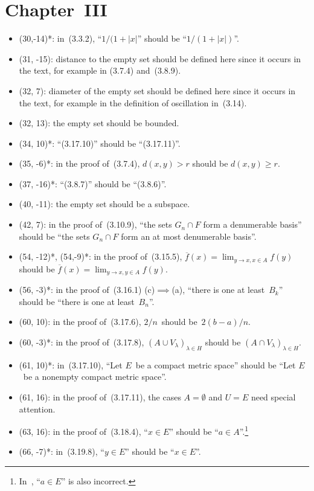 \documentclass[letterpaper,12pt]{article}
\newcommand{\union}{\cup}
\newcommand{\sect}{\cap}
\newcommand{\abs}[1]{|{#1}|}
\begin{document}
\section*{Chapter~III}
\begin{itemize}
\item (30,-14)*: in~(3.3.2), ``\(1/(1+\abs{x}\)'' should be ``\(1/(1+\abs{x})\)''.
\item (31, -15): distance to the empty set should be defined here since it occurs in the text, for example in (3.7.4) and~(3.8.9).
\item (32, 7): diameter of the empty set should be defined here since it occurs in the text, for example in the definition of oscillation in~(3.14).
\item (32, 13): the empty set should be bounded.
\item (34, 10)*: ``(3.17.10)'' should be ``(3.17.11)''.
\item (35, -6)*: in the proof of~(3.7.4), \(d(x,y)>r\) should be \(d(x,y)\ge r\).
\item (37, -16)*: ``(3.8.7)'' should be ``(3.8.6)''.
\item (40, -11): the empty set should be a subspace.
\item (42, 7): in the proof of~(3.10.9), ``the sets \(G_n\sect F\) form a denumerable basis'' should be ``the sets \(G_n\sect F\) form an at most denumerable basis''.
\item (54, -12)*, (54,-9)*: in the proof of~(3.15.5), \(\overline{f}(x)=\lim_{y\to x,x\in A}f(y)\) should be \(\overline{f}(x)=\lim_{y\to x,y\in A}f(y)\).
\item (56, -3)*: in the proof of~(3.16.1) (c)\(\implies\)(a), ``there is one at least~\(B_k\)'' should be ``there is one at least~\(B_n\)''.
\item (60, 10): in the proof of~(3.17.6), \(2/n\)~should be~\(2(b-a)/n\).
\item (60, -3)*: in the proof of~(3.17.8), \((A\union V_{\lambda})_{\lambda\in H}\) should be \((A\sect V_{\lambda})_{\lambda\in H}\).
\item (61, 10)*: in~(3.17.10), ``Let \(E\)~be a compact metric space'' should be ``Let \(E\)~be a nonempty compact metric space''.
\item (61, 16): in the proof of~(3.17.11), the cases \(A=\emptyset\) and \(U=E\) need special attention.
\item (63, 16): in the proof of~(3.18.4), ``\(x\in E\)'' should be ``\(a\in A\)''.\footnote{In~\cite{dieudonne9th}, ``\(a\in E\)'' is also incorrect.}
\item (66, -7)*: in~(3.19.8), ``\(y\in E\)'' should be ``\(x\in E\)''.
\end{itemize}
\end{document}
